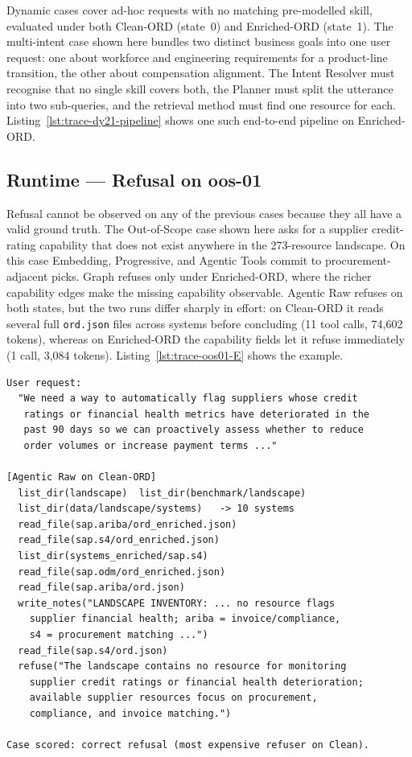 Dynamic cases cover ad-hoc requests with no matching pre-modelled skill, evaluated under both Clean-ORD (state~0) and Enriched-ORD (state~1). The multi-intent case shown here bundles two distinct business goals into one user request: one about workforce and engineering requirements for a product-line transition, the other about compensation alignment. The Intent Resolver must recognise that no single skill covers both, the Planner must split the utterance into two sub-queries, and the retrieval method must find one resource for each. Listing~\ref{lst:trace-dy21-pipeline} shows one such end-to-end pipeline on Enriched-ORD.


\subsection{Runtime --- Refusal on oos-01}
\label{appendix:trace-rt-oos-01}

Refusal cannot be observed on any of the previous cases because they all have a valid ground truth. The Out-of-Scope case shown here asks for a supplier credit-rating capability that does not exist anywhere in the 273-resource landscape. On this case Embedding, Progressive, and Agentic Tools commit to procurement-adjacent picks. Graph refuses only under Enriched-ORD, where the richer capability edges make the missing capability observable. Agentic Raw refuses on both states, but the two runs differ sharply in effort: on Clean-ORD it reads several full \texttt{ord.json} files across systems before concluding (11 tool calls, 74{,}602 tokens), whereas on Enriched-ORD the capability fields let it refuse immediately (1 call, 3{,}084 tokens). Listing~\ref{lst:trace-oos01-E} shows the example.

\begin{lstlisting}[float=!t, floatplacement=!t, basicstyle=\ttfamily\scriptsize, breaklines=true, frame=single, label={lst:trace-oos01-E}, caption={Agentic Raw refusal trace for \texttt{oos-01} on Clean-ORD (11 tool calls, 74{,}602 tokens). On Enriched-ORD Agentic Raw refuses immediately in a single call.}]
User request:
  "We need a way to automatically flag suppliers whose credit
   ratings or financial health metrics have deteriorated in the
   past 90 days so we can proactively assess whether to reduce
   order volumes or increase payment terms ..."

[Agentic Raw on Clean-ORD]
  list_dir(landscape)  list_dir(benchmark/landscape)
  list_dir(data/landscape/systems)   -> 10 systems
  read_file(sap.ariba/ord_enriched.json)
  read_file(sap.s4/ord_enriched.json)
  list_dir(systems_enriched/sap.s4)
  read_file(sap.odm/ord_enriched.json)
  read_file(sap.ariba/ord.json)
  write_notes("LANDSCAPE INVENTORY: ... no resource flags
    supplier financial health; ariba = invoice/compliance,
    s4 = procurement matching ...")
  read_file(sap.s4/ord.json)
  refuse("The landscape contains no resource for monitoring
    supplier credit ratings or financial health deterioration;
    available supplier resources focus on procurement,
    compliance, and invoice matching.")

Case scored: correct refusal (most expensive refuser on Clean).
\end{lstlisting}

